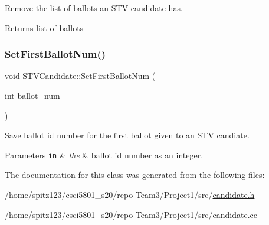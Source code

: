 Remove the list of ballots an S\+TV candidate has. 

\begin{DoxyReturn}{Returns}
list of ballots 
\end{DoxyReturn}
\mbox{\label{classSTVCandidate_af57688ad8fabeeff8c6738779c7bdc3e}} 
\subsubsection{\texorpdfstring{Set\+First\+Ballot\+Num()}{SetFirstBallotNum()}}
{\footnotesize\ttfamily void S\+T\+V\+Candidate\+::\+Set\+First\+Ballot\+Num (\begin{DoxyParamCaption}\item[{int}]{ballot\+\_\+num }\end{DoxyParamCaption})}



Save ballot id number for the first ballot given to an S\+TV candiate. 


\begin{DoxyParams}[1]{Parameters}
\mbox{\tt in}  & {\em the} & ballot id number as an integer. \\
\hline
\end{DoxyParams}


The documentation for this class was generated from the following files\+:\begin{DoxyCompactItemize}
\item 
/home/spitz123/csci5801\+\_\+s20/repo-\/\+Team3/\+Project1/src/\hyperlink{candidate_8h}{candidate.\+h}\item 
/home/spitz123/csci5801\+\_\+s20/repo-\/\+Team3/\+Project1/src/\hyperlink{candidate_8cc}{candidate.\+cc}\end{DoxyCompactItemize}
